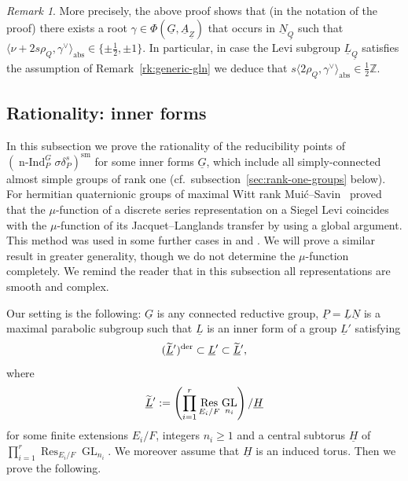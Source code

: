 \documentclass[a4paper]{amsart}
\numberwithin{equation}{section}
\theoremstyle{remark}
\newtheorem{remark}[thm]{Remark}
\theoremstyle{definition}
\DeclareMathOperator{\nInd}{n-Ind}
\DeclareMathOperator{\Res}{Res}
\newcommand{\Z}{\mathbb{Z}}
\DeclareMathOperator{\GL}{GL}
\newcommand{\sm}{\mathrm{sm}}
\newcommand{\alggrp}[1]{\underline{#1}}
\newcommand{\der}{\mathrm{der}}
\newcommand{\abs}{\mathrm{abs}}
\newcommand{\ang}[1]{\langle #1\rangle}
\newcommand{\lowprime}[1][\prime]{
  \mathchoice
    {\raisebox{-0.7ex}{$\scriptstyle #1$}}
    {\raisebox{-0.7ex}{$\scriptstyle #1$}}
    {\raisebox{-0.7ex}{$\scriptstyle #1$}}
    {\raisebox{-0.3ex}{$\scriptscriptstyle #1$}}
}
\begin{document}
\begin{remark}\label{rk:pole-qsplit}
  More precisely, the above proof shows that (in the notation of the proof) there exists a root $\gamma \in \Phi(\alggrp G,\alggrp A_{\alggrp Z})$ that occurs in $\alggrp N_{\alggrp Q}$
  such that $\ang{\nu+2s\rho_Q,\gamma^\vee}_\abs \in \{\pm \frac 12,\pm1\}$.
  In particular, in case the Levi subgroup $\alggrp L_{\alggrp Q}$ satisfies the assumption of Remark~\ref{rk:generic-gln} we deduce that $s\ang{2\rho_Q,\gamma^\vee}_\abs \in \frac 12\Z$.
\end{remark}



\subsection{Rationality: inner forms}
\label{sec:rati-inner-forms}
In this subsection we prove the rationality of the reducibility points of $(\nInd_{P}^{G}\sigma\delta_{P}^{s})^\sm$ for some inner forms $\alggrp{G}$, which include all simply-connected almost simple groups of rank one (cf.\ subsection~\ref{sec:rank-one-groups} below).
For hermitian quaternionic groups of maximal Witt rank Mui\'{c}--Savin~\cite[\S2]{MR1749954} proved that the $\mu$-function of a discrete series representation on a Siegel Levi coincides with the $\mu$-function of its Jacquet--Langlands transfer by using a global argument.
This method was used in some further cases in \cite{Konno} and \cite{MR3194161}.
We will prove a similar result in greater generality, though we do not determine the $\mu$-function completely.
We remind the reader that in this subsection all representations are smooth and complex.













Our setting is the following: $\alggrp{G}$ is any connected reductive group, $\alggrp{P} = \alggrp{L}\alggrp{N}$ is a maximal parabolic subgroup such that $\alggrp{L}$ is an inner form of a group $\alggrp{L}'$ satisfying 
\[(\widetilde{\alggrp{L}}^{\lowprime})^{\der} \subset \alggrp{L}' \subset \widetilde{\alggrp{L}}^{\lowprime},\]
where 
\[\widetilde{\alggrp{L}}^{\lowprime} := \left(\prod_{i=1}^r \Res_{E_i/F}\GL_{n_i}\right)/\alggrp{H}\]
for some finite extensions $E_i/F$, integers $n_i \ge 1$ and a central subtorus $\alggrp{H}$ of $\prod_{i=1}^r \Res_{E_i/F}\GL_{n_i}$.
We moreover assume that $\alggrp{H}$ is an induced torus.
Then we prove the following.
\end{document}

